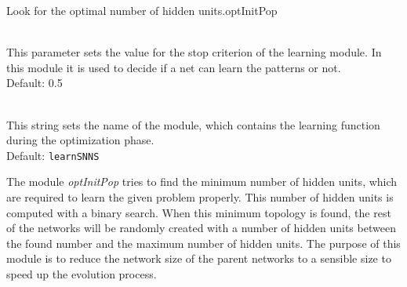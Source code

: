 \begin{moduledoc}{Look for the optimal number of hidden units.}{optInitPop}
  \item[\KeyWord{maxtss} \optParam{ x } ]~\\
    This parameter sets the value for the stop criterion of the learning module.
    In this module it is used to decide if a net can learn the patterns or not.\\
    Default: 0.5
  \item[\KeyWord{learnModul} \optParam{ x } ]~\\
    This string sets the name of the module, which
    contains the learning function during the optimization phase.\\
    Default: {\tt learnSNNS}
 \end{moduledoc}
The module {\it optInitPop} tries to find the minimum number of hidden units,
which are required to learn the given problem properly.
This number of hidden units is computed with a binary search.
When this minimum topology is found, the rest of the networks will be randomly 
created with a number of hidden units between the found number and the maximum number 
of hidden units.
The purpose of this module is to reduce the network size of the parent networks
to a sensible size to speed up the evolution process.


